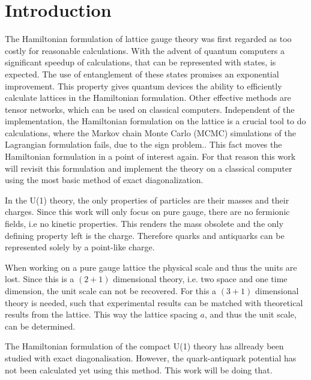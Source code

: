 \section{Introduction}
The Hamiltonian formulation of lattice gauge theory was first regarded as too costly for reasonable calculations. With the advent of quantum computers a significant speedup of calculations, that can be represented with states, is expected. The use of entanglement of these states promises an exponential improvement. This property gives quantum devices the ability to efficiently calculate lattices in the Hamiltonian formulation.\cite{Feynman1982, Bañuls2020} Other effective methods are tensor networks, which can be used on classical computers. Independent of the implementation, the Hamiltonian formulation on the lattice is a crucial tool to do calculations, where the Markov chain Monte Carlo (MCMC) simulations of the Lagrangian formulation fails, due to the sign problem.\cite{Garofalo:2024VV}. This fact moves the Hamiltonian formulation in a point of interest again. For that reason this work will revisit this formulation and implement the theory on a classical computer using the most basic method of exact diagonalization.

In the U(1) theory, the only properties of particles are their masses and their charges. Since this work will only focus on pure gauge, there are no fermionic fields, i.e no kinetic properties. This renders the mass obsolete and the only defining property left is the charge. Therefore quarks and antiquarks can be represented solely by a point-like charge.

When working on a pure gauge lattice the physical scale and thus the units are lost. Since this is a $(2+1)$ dimensional theory, i.e. two space and one time dimension, the unit scale can not be recovered. For this a $(3+1)$ dimensional theory is needed, such that experimental results can be matched with theoretical results from the lattice. This way the lattice spacing $a$, and thus the unit scale, can be determined.

The Hamiltonian formulation of the compact U(1) theory has allready been studied with exact diagonalisation. However, the quark-antiquark potential has not been calculated yet using this method. This work will be doing that. 

